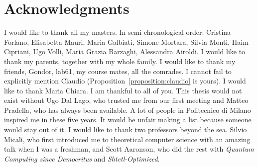 

\bigskip

\begingroup
\let\clearpage\relax
\let\cleardoublepage\relax
\let\cleardoublepage\relax
\chapter*{Acknowledgments}
I would like to thank all my masters. In semi-chronological order: Cristina Forlano, Elisabetta Mauri, Maria Galbiati, Simone Mortara, Silvia Monti, Haim Cipriani, Ugo Volli, Maria Grazia Barzaghi, Alessandra Airoldi. I would like to thank my parents, together with my whole family. I would like to thank my friends, Gondor, lab61, my course mates, all the comrades. I cannot fail to explicitly mention Claudio (Proposition~\ref{proposition:claudio} is yours). I would like to thank Maria Chiara. I am thankful to all of you. This thesis would not exist without Ugo Dal Lago, who trusted me from our first meeting and Matteo Pradella, who has always been available. A lot of people in Politecnico di Milano inspired me in these five years. It would be unfair making a list because someone would stay out of it. I would like to thank two professors beyond the sea. Silvio Micali, who first introduced me to theoretical computer science with an amazing talk when I was a freshman, and Scott Aaronson, who did the rest with \emph{Quantum Computing since Democritus} and \emph{Shtetl-Optimized}.


\endgroup



